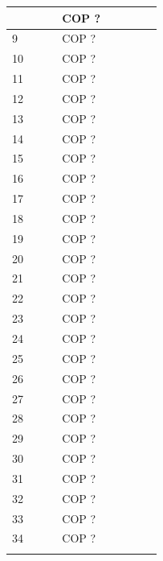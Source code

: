 \begin{center}
\begin{longtable}[H]{|p{0.333\linewidth}|p{0.3333\linewidth}|p{0.3333\linewidth}|}
{\begin{center}
\begin{tabular}{ |p{3.5cm}| p{3cm}|}
    8                       &  COP ?            \\ \hline
    9                       &  COP ?            \\ \hline
    10                      &  COP ?            \\ \hline
    11                      &  COP ?            \\ \hline
    12                      &  COP ?            \\ \hline
    13                      &  COP ?            \\ \hline
    14                      &  COP ?            \\ \hline
    15                      &  COP ?            \\ \hline
    16                      &  COP ?            \\ \hline
    17                      &  COP ?            \\ \hline
    18                      &  COP ?            \\ \hline
    19                      &  COP ?            \\ \hline
    20                      &  COP ?            \\ \hline
    21                      &  COP ?            \\ \hline
    22                      &  COP ?            \\ \hline
    23                      &  COP ?            \\ \hline
    24                      &  COP ?            \\ \hline
    25                      &  COP ?            \\ \hline
    26                      &  COP ?            \\ \hline
    27                      &  COP ?            \\ \hline
    28                      &  COP ?            \\ \hline
    29                      &  COP ?            \\ \hline
    30                      &  COP ?            \\ \hline
    31                      &  COP ?            \\ \hline
    32                      &  COP ?            \\ \hline
    33                      &  COP ?            \\ \hline
    34                      &  COP ?            \\ \hline

\end{tabular}
\end{center}}
\end{longtable}
\end{center}
